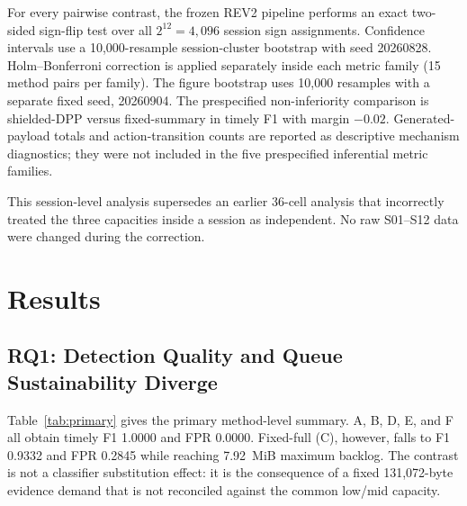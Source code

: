 \documentclass[10pt,journal]{IEEEtran}
\begin{document}
For every pairwise contrast, the frozen REV2 pipeline performs an exact two-sided sign-flip test over all $2^{12}=4{,}096$ session sign assignments. Confidence intervals use a 10,000-resample session-cluster bootstrap with seed 20260828. Holm--Bonferroni correction is applied separately inside each metric family (15 method pairs per family). The figure bootstrap uses 10,000 resamples with a separate fixed seed, 20260904. The prespecified non-inferiority comparison is shielded-DPP versus fixed-summary in timely F1 with margin $-0.02$. Generated-payload totals and action-transition counts are reported as descriptive mechanism diagnostics; they were not included in the five prespecified inferential metric families.

This session-level analysis supersedes an earlier 36-cell analysis that incorrectly treated the three capacities inside a session as independent. No raw S01--S12 data were changed during the correction.

\section{Results}
\subsection{RQ1: Detection Quality and Queue Sustainability Diverge}
Table~\ref{tab:primary} gives the primary method-level summary. A, B, D, E, and F all obtain timely F1 1.0000 and FPR 0.0000. Fixed-full (C), however, falls to F1 0.9332 and FPR 0.2845 while reaching 7.92~MiB maximum backlog. The contrast is not a classifier substitution effect: it is the consequence of a fixed 131,072-byte evidence demand that is not reconciled against the common low/mid capacity.
\end{document}
